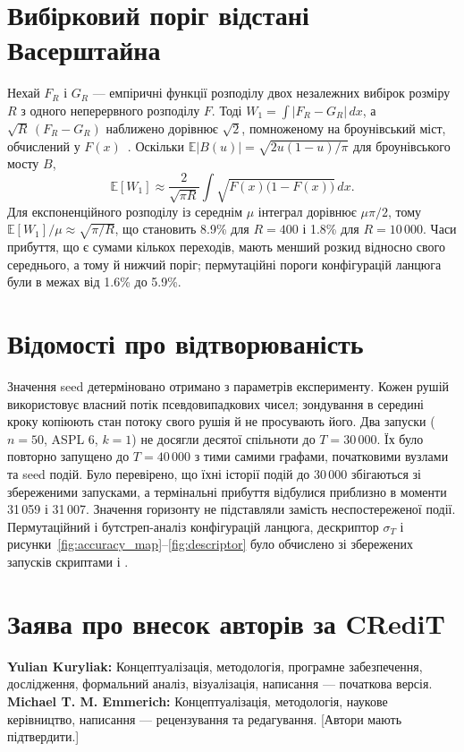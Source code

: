 \section{Вибірковий поріг відстані Васерштайна}
\label{app:floor}

Нехай $F_R$ і $G_R$ --- емпіричні функції розподілу двох незалежних вибірок розміру $R$ з одного неперервного розподілу $F$. Тоді $W_1=\int|F_R-G_R|\,dx$, а $\sqrt{R}\,(F_R-G_R)$ наближено дорівнює $\sqrt{2}$, помноженому на броунівський міст, обчислений у $F(x)$~\citep{delbarrio1999}. Оскільки $\mathbb{E}|B(u)|=\sqrt{2u(1-u)/\pi}$ для броунівського мосту $B$,
\[
\mathbb{E}[W_1]\approx\frac{2}{\sqrt{\pi R}}\int\sqrt{F(x)\bigl(1-F(x)\bigr)}\,dx .
\]
Для експоненційного розподілу із середнім $\mu$ інтеграл дорівнює $\mu\pi/2$, тому $\mathbb{E}[W_1]/\mu\approx\sqrt{\pi/R}$, що становить 8.9\% для $R=400$ і 1.8\% для $R=10\,000$. Часи прибуття, що є сумами кількох переходів, мають менший розкид відносно свого середнього, а тому й нижчий поріг; пермутаційні пороги конфігурацій ланцюга були в межах від 1.6\% до 5.9\%.

\section{Відомості про відтворюваність}
\label{app:repro}

Значення seed детерміновано отримано з параметрів експерименту. Кожен рушій \TS{} використовує власний потік псевдовипадкових чисел; зондування в середині кроку копіюють стан потоку свого рушія й не просувають його. Два запуски \Full{} ($n=50$, ASPL 6, $k=1$) не досягли десятої спільноти до $T=30\,000$. Їх було повторно запущено до $T=40\,000$ з тими самими графами, початковими вузлами та seed подій. Було перевірено, що їхні історії подій до 30\,000 збігаються зі збереженими запусками, а термінальні прибуття відбулися приблизно в моменти 31\,059 і 31\,007. Значення горизонту не підставляли замість неспостереженої події. Пермутаційний і бутстреп-аналіз конфігурацій ланцюга, дескриптор $\sigma_T$ і рисунки~\ref{fig:accuracy_map}--\ref{fig:descriptor} було обчислено зі збережених запусків скриптами  і .

\section*{Заява про внесок авторів за CRediT}
\textbf{Yulian Kuryliak:} Концептуалізація, методологія, програмне забезпечення, дослідження, формальний аналіз, візуалізація, написання --- початкова версія. \textbf{Michael T. M. Emmerich:} Концептуалізація, методологія, наукове керівництво, написання --- рецензування та редагування. [Автори мають підтвердити.]

